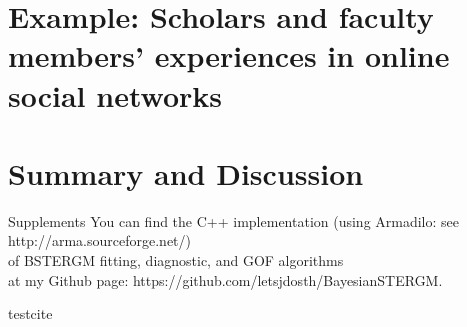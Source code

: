\documentclass[aspectratio=169,ignorenonframetext,9pt]{beamer}
\theoremstyle{plain}
\theoremstyle{definition}
\begin{document}
\section{Example: Scholars and faculty members' experiences
in online social networks}
\section{Summary and Discussion}







\begin{frame}{Supplements}
    You can find the C++ implementation (using Armadilo: see http://arma.sourceforge.net/)
    \\ of BSTERGM fitting, diagnostic, and GOF algorithms
    \\ at my Github page: https://github.com/letsjdosth/BayesianSTERGM.
\end{frame}


testcite \cite{RN100}

\nocite{*}


\end{document}
